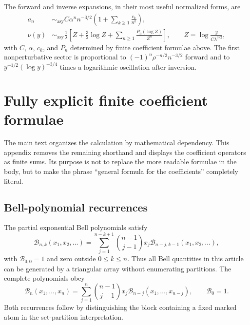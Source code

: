 \documentclass[11pt,a4paper,oneside,openany]{book}
\theoremstyle{definition}
\theoremstyle{remark}
\newcommand{\Bell}[1]{\mathcal B_{#1}}
\newcommand{\pBell}[2]{\mathcal B_{#1,#2}}
\newcommand{\asympseries}{\sim_{\!\mathrm{asy}}}
\begin{document}
\begin{resultbox}[title={Final dominant pair}]
The forward and inverse expansions, in their most useful normalized forms, are
\begin{align*}
 a_n&\asympseries
 C\alpha^n n^{-3/2}\left(1+\sum_{k\ge1}\frac{c_k}{n^k}\right),\\
 \nu(y)&\asympseries
 \frac1\lambda\left[
 Z+\frac32\log Z+
 \sum_{n\ge1}\frac{P_n(\log Z)}{Z^n}\right],
 \qquad Z=\log\frac{y}{C\lambda^{3/2}},
\end{align*}
with $C$, $\alpha$, $c_k$, and $P_n$ determined by finite coefficient formulae
above.  The first nonperturbative sector is proportional to
$(-1)^n\rho^{-n/2}n^{-3/2}$ forward and to
$y^{-1/2}(\log y)^{-3/4}$ times a logarithmic oscillation after inversion.
\end{resultbox}

\appendix

\chapter{Fully explicit finite coefficient formulae}
\label{app:finite-formulas}

The main text organizes the calculation by mathematical dependency.  This
appendix removes the remaining shorthand and displays the coefficient
operators as finite sums.  Its purpose is not to replace the more readable
formulae in the body, but to make the phrase ``general formula for the
coefficients'' completely literal.

\section{Bell-polynomial recurrences}
The partial exponential Bell polynomials satisfy
\begin{equation}
 \pBell nk(x_1,x_2,\ldots)
 =\sum_{j=1}^{n-k+1}\binom{n-1}{j-1}x_j
   \pBell{n-j}{k-1}(x_1,x_2,\ldots),
 \label{eq:bell-triangular-recurrence}
\end{equation}
with $\pBell00=1$ and zero outside $0\le k\le n$.  Thus all Bell quantities in
this article can be generated by a triangular array without enumerating
partitions.  The complete polynomials obey
\begin{equation}
 \Bell n(x_1,\ldots,x_n)
 =\sum_{j=1}^n\binom{n-1}{j-1}x_j
   \Bell{n-j}(x_1,\ldots,x_{n-j}),
 \qquad \Bell0=1.
 \label{eq:complete-bell-recurrence}
\end{equation}
Both recurrences follow by distinguishing the block containing a fixed marked
atom in the set-partition interpretation.
\end{document}
